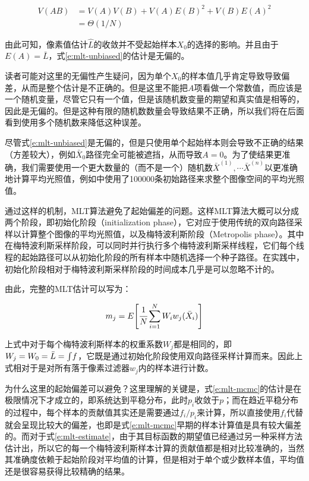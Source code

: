 \begin{equation}
\begin{aligned}
	V(AB)&=V(A)V(B)+V(A)E(B)^{2}+V(B)E(A)^{2}\\
	     &=\Theta(1/N)
\end{aligned}
\end{equation}

\noindent 由此可知，像素值估计$\hat{L}$的收敛并不受起始样本$X_0$的选择的影响。并且由于$E(A)=\bar{L}$，式\ref{e:mlt-unbiased}的估计是无偏的。

\begin{myshaded}
	读者可能对这里的无偏性产生疑问，因为单个$X_0$的样本值几乎肯定导致导致偏差，从而是整个估计是不正确的。但是这里不能把$A$项看做一个常数值，而应该是一个随机变量，尽管它只有一个值，但是该随机数变量的期望和真实值是相等的，因此是无偏的。但是这种有限的随机数数量会导致结果不正确，所以我们将在后面看到使用多个随机数来降低这种误差。
\end{myshaded}

尽管式\ref{e:mlt-unbiased}是无偏的，但是只使用单个起始样本则会导致不正确的结果（方差较大），例如$\bar{X}_0$路径完全可能被遮挡，从而导致$A=0$。为了使结果更准确，我们需要使用一个更大数量的（而不是一个）随机数$\bar{X}^{(1)},\cdots\bar{X}^{(n)}$以更准确地计算平均光照值，例如\cite{b:pbrt}中使用了100000条初始路径来求整个图像空间的平均光照值。

通过这样的机制，MLT算法避免了起始偏差的问题。这样MLT算法大概可以分成两个阶段，即初始化阶段（initialization phase），它对应于使用传统的双向路径采样以计算整个图像的平均光照值，以及梅特波利斯阶段（Metropolis phase）。其中在梅特波利斯采样阶段，可以同时并行执行多个梅特波利斯采样线程，它们每个线程的起始路径可以从初始化阶段的所有样本中随机选择一个种子路径。在实践中，初始化阶段相对于梅特波利斯采样阶段的时间成本几乎是可以忽略不计的。

由此，完整的MLT估计可以写为：

\begin{equation}\label{e:mlt-estimate}
	m_j=E\Biggl[  \cfrac{1}{N}\sum^{N}_{i=1}W_iw_j(\bar{X}_i)\Biggl]
\end{equation}

\noindent 上式中对于每个梅特波利斯样本的权重系数$W_j$都是相同的，即$W_j=W_0=\bar{L}={\rm \int} f$，它既是通过初始化阶段使用双向路径采样计算而来。因此上式相对于是对所有落于像素过滤器$w_j$内的样本进行计数。

\begin{myshaded}
	为什么这里的起始偏差可以避免？这里理解的关键是，式\ref{e:mlt-mcmc}的估计是在极限情况下才成立的，即系统达到平稳分布，此时$p_i$收敛于$p$；而在趋近平稳分布的过程中，每个样本的贡献值其实还是需要通过$f_i/p_i$来计算，所以直接使用$f_i$代替就会呈现比较大的偏差，也即是式\ref{e:mlt-mcmc}早期的样本计算值是具有较大偏差的。而对于式\ref{e:mlt-estimate}，由于其目标函数的期望值已经通过另一种采样方法估计出，所以它的每一个梅特波利斯样本计算的贡献值都是相对比较准确的，当然其准确度依赖于起始阶段对平均值的计算，但是相对于单个或少数样本值，平均值还是很容易获得比较精确的结果。
\end{myshaded}

